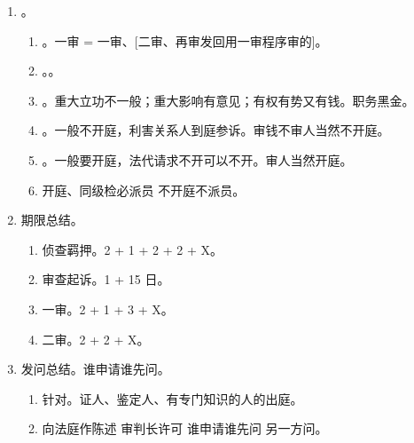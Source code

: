 \begin{enumerate}
\begin{enumerate}
          \item {}。
                \begin{enumerate}
                  \item {}。一审 = 一审、[二审、再审发回用一审程序审的]。
                  \item {}。。
                  \item {}。重大立功不一般；重大影响有意见；有权有势又有钱。职务黑金。
                  \item {}。一般不开庭，利害关系人到庭参诉。审钱不审人当然不开庭。
                  \item {}。一般要开庭，法代请求不开可以不开。审人当然开庭。
                  \item 开庭、同级检必派员 \yjt 不开庭不派员。
                \end{enumerate}
          \item 期限总结。
                \begin{enumerate}
                  \item 侦查羁押。2 + 1 + 2 + 2 + X。
                  \item 审查起诉。1 + 15 日。
                  \item 一审。2 + 1 + 3 + X。
                  \item 二审。2 + 2 + X。
                \end{enumerate}
          \item 发问总结。谁申请谁先问。
                \begin{enumerate}
                  \item 针对。证人、鉴定人、有专门知识的人的出庭。
                  \item 向法庭作陈述 \yjt 审判长许可 \yjt 谁申请谁先问 \yjt 另一方问。
                \end{enumerate}
        \end{enumerate}
\end{enumerate}
